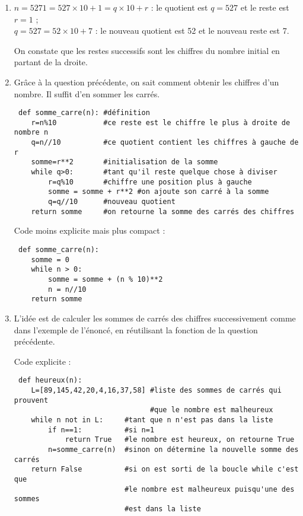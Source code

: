 \begin{enumerate}
 \item $ n = 5271 = 527\times 10 + 1 = q\times 10 + r$ : le quotient est $q=527$ et le reste est $r=1$ ;\\
 $q = 527 = 52 \times 10 + 7$ : le nouveau quotient est 52 et le nouveau reste est 7.
  
  On constate que les restes successifs sont les chiffres du nombre initial en partant de la droite.
  
\item Grâce à la question précédente, on sait comment obtenir les chiffres d'un nombre. Il suffit d'en sommer les carrés. 

\begin{verbatim}
 def somme_carre(n): #définition
    r=n%10           #ce reste est le chiffre le plus à droite de nombre n
    q=n//10          #ce quotient contient les chiffres à gauche de r
    somme=r**2       #initialisation de la somme
    while q>0:       #tant qu'il reste quelque chose à diviser
        r=q%10       #chiffre une position plus à gauche
        somme = somme + r**2 #on ajoute son carré à la somme
        q=q//10      #nouveau quotient
    return somme     #on retourne la somme des carrés des chiffres
\end{verbatim}

Code moins explicite mais plus compact :
\begin{verbatim}
 def somme_carre(n):
    somme = 0
    while n > 0:
        somme = somme + (n % 10)**2
        n = n//10
    return somme
\end{verbatim}

\item L'idée est de calculer les sommes de carrés des chiffres successivement comme dans l'exemple de l'énoncé, en réutilisant la fonction de la question précédente.

Code explicite :
\begin{verbatim}
 def heureux(n):
    L=[89,145,42,20,4,16,37,58] #liste des sommes de carrés qui prouvent
                                #que le nombre est malheureux
    while n not in L:     #tant que n n'est pas dans la liste   
        if n==1:          #si n=1
            return True   #le nombre est heureux, on retourne True
        n=somme_carre(n)  #sinon on détermine la nouvelle somme des carrés
    return False          #si on est sorti de la boucle while c'est que
                          #le nombre est malheureux puisqu'une des sommes
                          #est dans la liste
\end{verbatim}


\end{enumerate}
